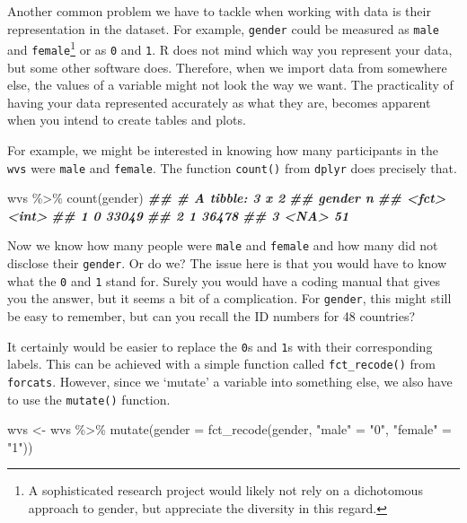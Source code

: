 \documentclass[
]{book}
\newenvironment{Shaded}{\begin{snugshade}}{\end{snugshade}}
\newcommand{\AttributeTok}[1]{\textcolor[rgb]{0.77,0.63,0.00}{#1}}
\newcommand{\DocumentationTok}[1]{\textcolor[rgb]{0.56,0.35,0.01}{\textbf{\textit{#1}}}}
\newcommand{\FunctionTok}[1]{\textcolor[rgb]{0.00,0.00,0.00}{#1}}
\newcommand{\NormalTok}[1]{#1}
\newcommand{\OtherTok}[1]{\textcolor[rgb]{0.56,0.35,0.01}{#1}}
\newcommand{\SpecialCharTok}[1]{\textcolor[rgb]{0.00,0.00,0.00}{#1}}
\newcommand{\StringTok}[1]{\textcolor[rgb]{0.31,0.60,0.02}{#1}}
\begin{document}
Another common problem we have to tackle when working with data is their representation in the dataset. For example, \texttt{gender} could be measured as \texttt{male} and \texttt{female}\footnote{A sophisticated research project would likely not rely on a dichotomous approach to gender, but appreciate the diversity in this regard.} or as \texttt{0} and \texttt{1}. R does not mind which way you represent your data, but some other software does. Therefore, when we import data from somewhere else, the values of a variable might not look the way we want. The practicality of having your data represented accurately as what they are, becomes apparent when you intend to create tables and plots.

For example, we might be interested in knowing how many participants in the \texttt{wvs} were \texttt{male} and \texttt{female}. The function \texttt{count()} from \texttt{dplyr} does precisely that.

\begin{Shaded}
\begin{Highlighting}[]
\NormalTok{wvs }\SpecialCharTok{\%\textgreater{}\%} \FunctionTok{count}\NormalTok{(gender)}
\DocumentationTok{\#\# \# A tibble: 3 x 2}
\DocumentationTok{\#\#   gender     n}
\DocumentationTok{\#\#   \textless{}fct\textgreater{}  \textless{}int\textgreater{}}
\DocumentationTok{\#\# 1 0      33049}
\DocumentationTok{\#\# 2 1      36478}
\DocumentationTok{\#\# 3 \textless{}NA\textgreater{}      51}
\end{Highlighting}
\end{Shaded}

Now we know how many people were \texttt{male} and \texttt{female} and how many did not disclose their \texttt{gender}. Or do we? The issue here is that you would have to know what the \texttt{0} and \texttt{1} stand for. Surely you would have a coding manual that gives you the answer, but it seems a bit of a complication. For \texttt{gender}, this might still be easy to remember, but can you recall the ID numbers for 48 countries?

It certainly would be easier to replace the \texttt{0}s and \texttt{1}s with their corresponding labels. This can be achieved with a simple function called \texttt{fct\_recode()} from \texttt{forcats}. However, since we `mutate' a variable into something else, we also have to use the \texttt{mutate()} function.

\begin{Shaded}
\begin{Highlighting}[]
\NormalTok{wvs }\OtherTok{\textless{}{-}}\NormalTok{ wvs }\SpecialCharTok{\%\textgreater{}\%} \FunctionTok{mutate}\NormalTok{(}\AttributeTok{gender =} \FunctionTok{fct\_recode}\NormalTok{(gender, }\StringTok{"male"} \OtherTok{=} \StringTok{"0"}\NormalTok{, }\StringTok{"female"} \OtherTok{=} \StringTok{"1"}\NormalTok{))}
\end{Highlighting}
\end{Shaded}
\end{document}
